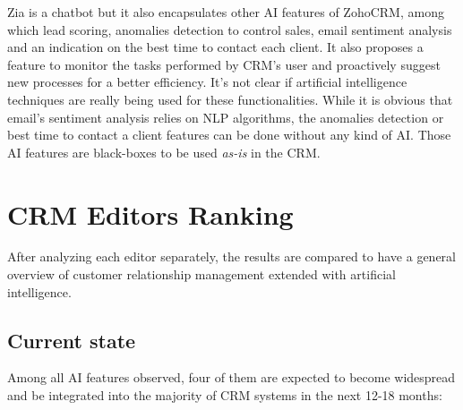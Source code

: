 Zia is a chatbot but it also encapsulates other AI features of ZohoCRM, among which lead scoring, anomalies detection to control sales, email sentiment analysis and an indication on the best time to contact each client. It also proposes a feature to monitor the tasks performed by CRM's user and proactively suggest new processes for a better efficiency. It's not clear if artificial intelligence techniques are really being used for these functionalities. While it is obvious that email's sentiment analysis relies on NLP algorithms, the anomalies detection or best time to contact a client features can be done without any kind of AI. Those AI features are black-boxes to be used \textit{as-is} in the CRM.


\section{CRM Editors Ranking}
After analyzing each editor separately, the results are compared to have a general overview of customer relationship management extended with artificial intelligence.

\subsection{Current state}
Among all AI features observed, four of them are expected to become widespread and be integrated into the majority of CRM systems in the next 12-18 months:


